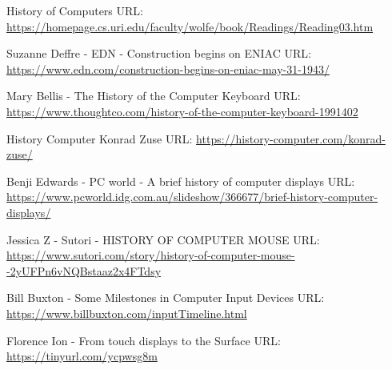 \documentclass{article}
\begin{document}

 \newpage
 \begin{thebibliography}{00}
    
 History of Computers
\newline
URL: \url{https://homepage.cs.uri.edu/faculty/wolfe/book/Readings/Reading03.htm}

 Suzanne Deffre - EDN - Construction begins on ENIAC
\newline
URL: \url{https://www.edn.com/construction-begins-on-eniac-may-31-1943/}

 Mary Bellis - The History of the Computer Keyboard
\newline
URL: \url{https://www.thoughtco.com/history-of-the-computer-keyboard-1991402}

 History Computer Konrad Zuse
\newline
URL: \url{https://history-computer.com/konrad-zuse/}

 Benji Edwards - PC world - A brief history of computer displays
\newline
URL: \url{https://www.pcworld.idg.com.au/slideshow/366677/brief-history-computer-displays/}

 Jessica Z - Sutori - HISTORY OF COMPUTER MOUSE
\newline
URL: \url{https://www.sutori.com/story/history-of-computer-mouse--2yUFPn6vNQBstaaz2x4FTdsy}

 Bill Buxton - Some Milestones in Computer Input Devices
\newline
URL: \url{https://www.billbuxton.com/inputTimeline.html}

 Florence Ion - From touch displays to the Surface
\newline
URL: \url{https://tinyurl.com/ycpwsg8m}

\end{thebibliography}

\end{document}
